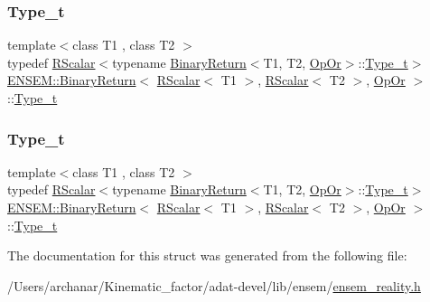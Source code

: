 \subsubsection{\texorpdfstring{Type\_t}{Type\_t}\hspace{0.1cm}{\footnotesize\ttfamily [2/3]}}
{\footnotesize\ttfamily template$<$class T1 , class T2 $>$ \\
typedef \mbox{\hyperlink{classENSEM_1_1RScalar}{R\+Scalar}}$<$typename \mbox{\hyperlink{structENSEM_1_1BinaryReturn}{Binary\+Return}}$<$T1, T2, \mbox{\hyperlink{structENSEM_1_1OpOr}{Op\+Or}}$>$\+::\mbox{\hyperlink{structENSEM_1_1BinaryReturn_3_01RScalar_3_01T1_01_4_00_01RScalar_3_01T2_01_4_00_01OpOr_01_4_a55700962e5da25bd0a2bfbe68d9e17ce}{Type\+\_\+t}}$>$ \mbox{\hyperlink{structENSEM_1_1BinaryReturn}{E\+N\+S\+E\+M\+::\+Binary\+Return}}$<$ \mbox{\hyperlink{classENSEM_1_1RScalar}{R\+Scalar}}$<$ T1 $>$, \mbox{\hyperlink{classENSEM_1_1RScalar}{R\+Scalar}}$<$ T2 $>$, \mbox{\hyperlink{structENSEM_1_1OpOr}{Op\+Or}} $>$\+::\mbox{\hyperlink{structENSEM_1_1BinaryReturn_3_01RScalar_3_01T1_01_4_00_01RScalar_3_01T2_01_4_00_01OpOr_01_4_a55700962e5da25bd0a2bfbe68d9e17ce}{Type\+\_\+t}}}

\mbox{\label{structENSEM_1_1BinaryReturn_3_01RScalar_3_01T1_01_4_00_01RScalar_3_01T2_01_4_00_01OpOr_01_4_a55700962e5da25bd0a2bfbe68d9e17ce}} 
\subsubsection{\texorpdfstring{Type\_t}{Type\_t}\hspace{0.1cm}{\footnotesize\ttfamily [3/3]}}
{\footnotesize\ttfamily template$<$class T1 , class T2 $>$ \\
typedef \mbox{\hyperlink{classENSEM_1_1RScalar}{R\+Scalar}}$<$typename \mbox{\hyperlink{structENSEM_1_1BinaryReturn}{Binary\+Return}}$<$T1, T2, \mbox{\hyperlink{structENSEM_1_1OpOr}{Op\+Or}}$>$\+::\mbox{\hyperlink{structENSEM_1_1BinaryReturn_3_01RScalar_3_01T1_01_4_00_01RScalar_3_01T2_01_4_00_01OpOr_01_4_a55700962e5da25bd0a2bfbe68d9e17ce}{Type\+\_\+t}}$>$ \mbox{\hyperlink{structENSEM_1_1BinaryReturn}{E\+N\+S\+E\+M\+::\+Binary\+Return}}$<$ \mbox{\hyperlink{classENSEM_1_1RScalar}{R\+Scalar}}$<$ T1 $>$, \mbox{\hyperlink{classENSEM_1_1RScalar}{R\+Scalar}}$<$ T2 $>$, \mbox{\hyperlink{structENSEM_1_1OpOr}{Op\+Or}} $>$\+::\mbox{\hyperlink{structENSEM_1_1BinaryReturn_3_01RScalar_3_01T1_01_4_00_01RScalar_3_01T2_01_4_00_01OpOr_01_4_a55700962e5da25bd0a2bfbe68d9e17ce}{Type\+\_\+t}}}



The documentation for this struct was generated from the following file\+:\begin{DoxyCompactItemize}
\item 
/\+Users/archanar/\+Kinematic\+\_\+factor/adat-\/devel/lib/ensem/\mbox{\hyperlink{adat-devel_2lib_2ensem_2ensem__reality_8h}{ensem\+\_\+reality.\+h}}\end{DoxyCompactItemize}
